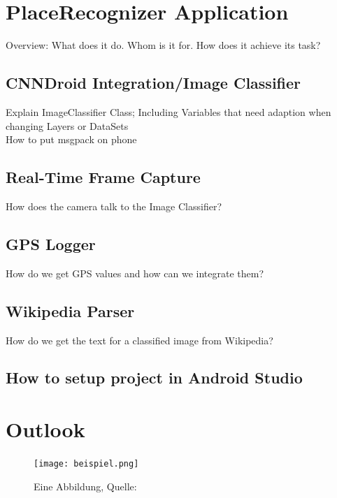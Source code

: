 \documentclass[a4paper,12pt,pagesize,headsepline,bibtotoc,titlepage]{scrartcl}
\begin{document}
\newpage
\section {PlaceRecognizer Application}
Overview: What does it do. Whom is it for. How does it achieve its task?

\subsection {CNNDroid Integration/Image Classifier}
Explain ImageClassifier Class; Including Variables that need adaption when changing Layers or DataSets\\
How to put msgpack on phone

\subsection {Real-Time Frame Capture}
How does the camera talk to the Image Classifier?

\subsection {GPS Logger}
How do we get GPS values and how can we integrate them?

\subsection {Wikipedia Parser}
How do we get the text for a classified image from Wikipedia?

\subsection{How to setup project in Android Studio}

\section{Outlook}


\begin{figure}[hbp]
\begin{center}
\texttt{[image: beispiel.png]}\\
\caption{Eine Abbildung, Quelle: \cite{cnndroid2016}}
\label{abb:test}
\end{center}
\end{figure}

\newpage
{}

\end{document}
